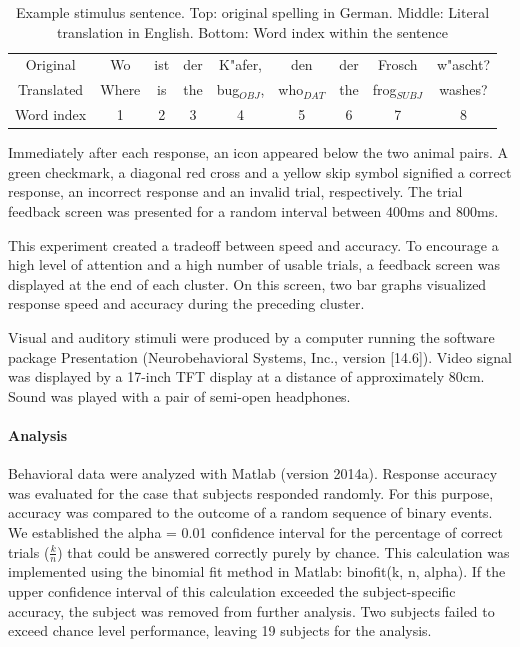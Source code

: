 \vspace{5mm}
\begin{table}[htb]
\begin{center}
\begin{tabular}{c|cccccccc}
Original & Wo & ist & der & K"afer, & den & der & Frosch & w"ascht?\\
Translated & Where & is & the & bug$_{OBJ}$, & who$_{DAT}$ & the & frog$_{SUBJ}$ & washes?\\
Word index & 1 & 2 & 3 & 4 & 5 & 6 & 7 & 8
\end{tabular}
\caption{\label{2.sentences} Example stimulus sentence. Top: original spelling in German. Middle: Literal translation in English. Bottom: Word index within the sentence}
\end{center}
\end{table}
\vspace{5mm}

Immediately after each response, an icon appeared below the two animal pairs.
A green checkmark, a diagonal red cross and a yellow skip symbol signified a correct response, an incorrect response and an invalid trial, respectively.
The trial feedback screen was presented for a random interval between 400ms and 800ms.

This experiment created a tradeoff between speed and accuracy.
To encourage a high level of attention and a high number of usable trials, a feedback screen was displayed at the end of each cluster.
On this screen, two bar graphs visualized response speed and accuracy during the preceding cluster.

Visual and auditory stimuli were produced by a computer running the software package Presentation (Neurobehavioral Systems, Inc., version [14.6]).
Video signal was displayed by a 17-inch TFT display at a distance of approximately 80cm.
Sound was played with a pair of semi-open headphones.


\paragraph{Analysis}

Behavioral data were analyzed with Matlab (version 2014a).
Response accuracy was evaluated for the case that subjects responded randomly.
For this purpose, accuracy was compared to the outcome of a random sequence of binary events.
We established the alpha = 0.01 confidence interval for the percentage of correct trials ($\frac{k}{n}$) that could be answered correctly purely by chance.
This calculation was implemented using the binomial fit method in Matlab: binofit(k, n, alpha).
If the upper confidence interval of this calculation exceeded the subject-specific accuracy, the subject was removed from further analysis.
Two subjects failed to exceed chance level performance, leaving 19 subjects for the analysis.


